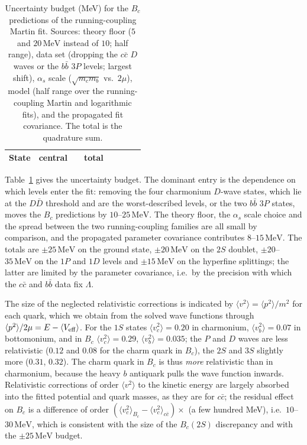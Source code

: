 \documentclass[10pt,twocolumn]{article}
\newcommand{\Bc}{B_c}
\newcommand{\cc}{c\bar c}
\newcommand{\bb}{b\bar b}
\newcommand{\MeV}{\,\mathrm{MeV}}
\begin{document}
\begin{table}[t]
\caption{Uncertainty budget (MeV) for the $\Bc$ predictions of the running-coupling Martin fit. Sources: theory floor ($5$ and $20\MeV$ instead of $10$; half range), data set (dropping the $\cc$ $D$ waves or the $\bb$ $3P$ levels; largest shift), $\alpha_s$ scale ($\sqrt{m_cm_b}$ vs.\ $2\mu$), model (half range over the running-coupling Martin and logarithmic fits), and the propagated fit covariance. The total is the quadrature sum.}
\label{tab:budget}
\centering\small
\begin{tabular}{lccccccc}
\toprule
State & central & & total \\
\midrule

\end{tabular}
\end{table}

Table~\ref{tab:budget} gives the uncertainty budget.
The dominant entry is the dependence on which levels enter the fit: removing the four charmonium $D$-wave states, which lie at the $D\bar D$ threshold and are the worst-described levels, or the two $\bb$ $3P$ states, moves the $\Bc$ predictions by $10$--$25\MeV$.
The theory floor, the $\alpha_s$ scale choice and the spread between the two running-coupling families are all small by comparison, and the propagated parameter covariance contributes $8$--$15\MeV$.
The totals are $\pm25\MeV$ on the ground state, $\pm20\MeV$ on the $2S$ doublet, $\pm20$--$35\MeV$ on the $1P$ and $1D$ levels and $\pm15\MeV$ on the hyperfine splittings; the latter are limited by the parameter covariance, i.e.\ by the precision with which the $\cc$ and $\bb$ data fix $\Lambda$.

The size of the neglected relativistic corrections is indicated by $\langle v^2\rangle=\langle p^2\rangle/m^2$ for each quark, which we obtain from the solved wave functions through $\langle p^2\rangle/2\mu=E-\langle V_{\rm eff}\rangle$.
For the $1S$ states $\langle v_c^2\rangle=0.20$ in charmonium, $\langle v_b^2\rangle=0.07$ in bottomonium, and in $\Bc$ $\langle v_c^2\rangle=0.29$, $\langle v_b^2\rangle=0.035$; the $P$ and $D$ waves are less relativistic ($0.12$ and $0.08$ for the charm quark in $\Bc$), the $2S$ and $3S$ slightly more ($0.31$, $0.32$).
The charm quark in $\Bc$ is thus \emph{more} relativistic than in charmonium, because the heavy $b$ antiquark pulls the wave function inwards.
Relativistic corrections of order $\langle v^2\rangle$ to the kinetic energy are largely absorbed into the fitted potential and quark masses, as they are for $\cc$; the residual effect on $\Bc$ is a difference of order $(\langle v_c^2\rangle_{\Bc}-\langle v_c^2\rangle_{\cc})\times$ (a few hundred MeV), i.e.\ $10$--$30\MeV$, which is consistent with the size of the $\Bc(2S)$ discrepancy and with the $\pm25\MeV$ budget.
\end{document}
